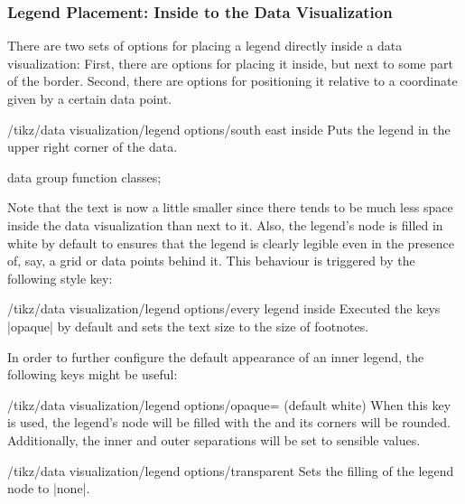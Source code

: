 \subsubsection{Legend Placement: Inside to the Data Visualization}
\label{section-dv-legend-inside}

There are two sets of options for placing a legend directly inside a data
visualization: First, there are options for placing it inside, but next to some
part of the border. Second, there are options for positioning it relative to a
coordinate given by a certain data point.

\begin{key}{/tikz/data visualization/legend options/south east inside}
    Puts the legend in the upper right corner of the data.
\begin{codeexample}[width=8cm]
\tikz \datavisualization [
  scientific axes,
  visualize as smooth line/.list=
    {log, lin},
  legend=south east inside,
  log=    {label in legend={text=$\log x$}},
  lin=    {label in legend={text=$x/2$}},
  style sheet=strong colors]
data group {function classes};
\end{codeexample}

    Note that the text is now a little smaller since there tends to be much
    less space inside the data visualization than next to it. Also, the
    legend's node is filled in white by default to ensures that the legend is
    clearly legible even in the presence of, say, a grid or data points behind
    it. This behaviour is triggered by the following style key:

    \begin{stylekey}{/tikz/data visualization/legend options/every legend inside}
        Executed the keys |opaque| by default and sets the  text size to the
        size of footnotes.
    \end{stylekey}
\end{key}

In order to further configure the default appearance of an inner legend, the
following keys might be useful:

\begin{key}{/tikz/data visualization/legend options/opaque= (default white)}
    When this key is used, the legend's node will be filled with the
     and its corners will be rounded. Additionally, the inner and
    outer separations will be set to sensible values.
\end{key}
%
\begin{key}{/tikz/data visualization/legend options/transparent}
    Sets the filling of the legend node to |none|.
\end{key}

